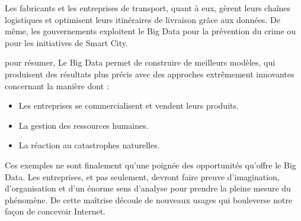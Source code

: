 Les fabricants et les entreprises de transport, quant à eux, gèrent leurs chaînes logistiques et optimisent leurs itinéraires de livraison grâce aux données. De même, les gouvernements exploitent le Big Data pour la prévention du crime ou pour les initiatives de Smart City.

pour résumer, Le Big Data permet de construire de meilleurs modèles, qui produisent
des résultats plus précis avec des approches extrêmement innovantes concernant
la manière dont :

\begin{itemize}\renewcommand{\labelitemi}{$\bullet$}
\item Les entreprises se commercialisent et vendent leurs produits.
\item La gestion des ressources humaines.
\item La réaction au catastrophes naturelles.
\end{itemize}

Ces exemples ne sont finalement qu'une poignée des opportunités qu'offre le Big Data. Les entreprises, et pas seulement, devront faire preuve d'imagination, d'organisation et d'un énorme sens d'analyse pour prendre la pleine mesure du phénomène. De cette maîtrise découle de nouveaux usages qui bouleverse notre façon de concevoir
Internet.


